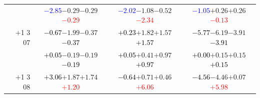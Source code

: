 \documentclass[compress]{beamer}
\begin{document}
\begin{frame}
\begin{tabular}{r | c | c | c}
          & \textcolor{blue}{$-2.85$}\hspace{0.1 cm}$-0.29$\hspace{0.1 cm}$-0.29$\hspace{0.1 cm}\textcolor{red}{$-0.29$} & \textcolor{blue}{$-2.02$}\hspace{0.1 cm}$-1.08$\hspace{0.1 cm}$-0.52$\hspace{0.1 cm}\textcolor{red}{$-2.34$} & \textcolor{blue}{$-1.05$}\hspace{0.1 cm}$+0.26$\hspace{0.1 cm}$+0.26$\hspace{0.1 cm}\textcolor{red}{$-0.13$} \\
$+$1 3 07 & \textcolor{black}{$-0.67$}\hspace{0.1 cm}$-1.99$\hspace{0.1 cm}$-0.37$\hspace{0.1 cm}\textcolor{black}{$-0.37$} & \textcolor{black}{$+0.23$}\hspace{0.1 cm}$+1.82$\hspace{0.1 cm}$+1.57$\hspace{0.1 cm}\textcolor{black}{$+1.57$} & \textcolor{black}{$-5.77$}\hspace{0.1 cm}$-6.19$\hspace{0.1 cm}$-3.91$\hspace{0.1 cm}\textcolor{black}{$-3.91$} \\
          & \textcolor{black}{$+0.05$}\hspace{0.1 cm}$-0.19$\hspace{0.1 cm}$-0.19$\hspace{0.1 cm}\textcolor{black}{$-0.19$} & \textcolor{black}{$+0.05$}\hspace{0.1 cm}$+0.41$\hspace{0.1 cm}$+0.97$\hspace{0.1 cm}\textcolor{black}{$+0.97$} & \textcolor{black}{$+0.00$}\hspace{0.1 cm}$+0.15$\hspace{0.1 cm}$+0.15$\hspace{0.1 cm}\textcolor{black}{$+0.15$} \\
$+$1 3 08 & \textcolor{black}{$+3.06$}\hspace{0.1 cm}$+1.87$\hspace{0.1 cm}$+1.74$\hspace{0.1 cm}\textcolor{red}{$+1.20$} & \textcolor{black}{$-0.64$}\hspace{0.1 cm}$+0.71$\hspace{0.1 cm}$+0.46$\hspace{0.1 cm}\textcolor{red}{$+6.06$} & \textcolor{black}{$-4.56$}\hspace{0.1 cm}$-4.46$\hspace{0.1 cm}$+0.07$\hspace{0.1 cm}\textcolor{red}{$+5.98$} \\

\end{tabular}
\end{frame}
\end{document}
